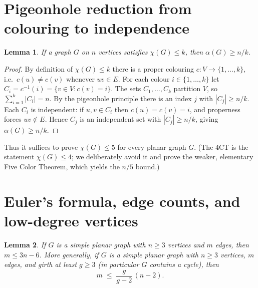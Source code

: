 \documentclass{amsart}
\newtheorem{lemma}{Lemma}
\theoremstyle{remark}
\begin{document}
\section{Pigeonhole reduction from colouring to independence}

\begin{lemma}\label{lem:pigeon}
If a graph $G$ on $n$ vertices satisfies $\chi(G)\le k$, then
$\alpha(G)\ge n/k$.
\end{lemma}

\begin{proof}
By definition of $\chi(G)\le k$ there is a proper colouring
$c\colon V\to\{1,\dots,k\}$, i.e.\ $c(u)\ne c(v)$ whenever $uv\in E$. For each
colour $i\in\{1,\dots,k\}$ let $C_i=c^{-1}(i)=\{v\in V: c(v)=i\}$. The sets
$C_1,\dots,C_k$ partition $V$, so $\sum_{i=1}^{k}|C_i|=n$. By the pigeonhole
principle there is an index $j$ with $|C_j|\ge n/k$. Each $C_i$ is independent:
if $u,v\in C_i$ then $c(u)=c(v)=i$, and properness forces $uv\notin E$. Hence
$C_j$ is an independent set with $|C_j|\ge n/k$, giving $\alpha(G)\ge n/k$.
\end{proof}

Thus it suffices to prove $\chi(G)\le 5$ for every planar graph $G$. (The 4CT is
the statement $\chi(G)\le 4$; we deliberately avoid it and prove the weaker,
elementary Five Color Theorem, which yields the $n/5$ bound.)

\section{Euler's formula, edge counts, and low-degree vertices}

\begin{lemma}\label{lem:edges}
If $G$ is a simple planar graph with $n\ge 3$ vertices and $m$ edges, then
$m\le 3n-6$. More generally, if $G$ is a simple planar graph with $n\ge3$
vertices, $m$ edges, and girth at least $g\ge3$ (in particular $G$ contains a
cycle), then
\begin{equation}\label{eq:girth-edges}
   m \;\le\; \frac{g}{g-2}\,(n-2).
\end{equation}
\end{lemma}
\end{document}
